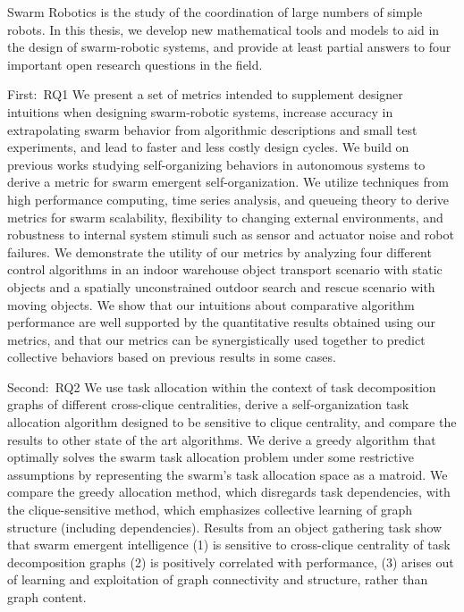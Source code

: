 
Swarm Robotics is the study of the coordination of large numbers of simple
robots. In this thesis, we develop new mathematical tools and models to aid in
the design of swarm-robotic systems, and provide at least partial answers to
four important open research questions in the field.

First:~\glsdesc{RQ1} We present a set of metrics intended to
supplement designer intuitions when designing swarm-robotic systems, increase
accuracy in extrapolating swarm behavior from algorithmic descriptions and small
test experiments, and lead to faster and less costly design cycles. We build on
previous works studying self-organizing behaviors in autonomous systems to
derive a metric for swarm emergent self-organization.  We utilize techniques
from high performance computing, time series analysis, and queueing theory to
derive metrics for swarm scalability, flexibility to changing external
environments, and robustness to internal system stimuli such as sensor and
actuator noise and robot failures.  We demonstrate the utility of our metrics by
analyzing four different control algorithms in an indoor warehouse object
transport scenario with static objects and a spatially unconstrained outdoor
search and rescue scenario with moving objects. We show that our intuitions
about comparative algorithm performance are well supported by the quantitative
results obtained using our metrics, and that our metrics can be synergistically
used together to predict collective behaviors based on previous results in some
cases.



Second:~\glsdesc{RQ2} We use task
allocation within the context of task decomposition graphs of different
cross-clique centralities, derive a self-organization task allocation algorithm
designed to be sensitive to clique centrality, and compare the results to other
state of the art algorithms. We derive a greedy algorithm that optimally solves
the swarm task allocation problem under some restrictive assumptions by
representing the swarm's task allocation space as a matroid. We compare the
greedy allocation method, which disregards task dependencies, with the
clique-sensitive method, which emphasizes collective learning of graph structure
(including dependencies). Results from an object gathering task show that swarm
emergent intelligence (1) is sensitive to cross-clique centrality of task
decomposition graphs (2) is positively correlated with performance, (3) arises
out of learning and exploitation of graph connectivity and structure, rather
than graph content.

